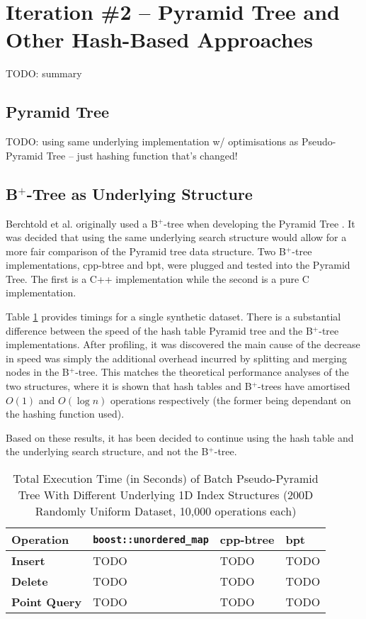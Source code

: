 \section{Iteration \#2 -- Pyramid Tree and Other Hash-Based Approaches}

TODO: summary

\subsection{Pyramid Tree}

TODO: using same underlying implementation w/ optimisations as Pseudo-Pyramid Tree -- just hashing function that's changed!

\subsection{B${}^+$-Tree as Underlying Structure}

Berchtold et al. originally used a B${}^{+}$-tree when developing the Pyramid Tree \cite{pyramid-tree}. It was decided that using the same underlying search structure would allow for a more fair comparison of the Pyramid tree data structure. Two B${}^{+}$-tree implementations, cpp-btree\cite{cpp-btree} and bpt\cite{bpt}, were plugged and tested into the Pyramid Tree. The first is a C++ implementation while the second is a pure C implementation.

Table \ref{tab:hashtable-bplus-time-comparison} provides timings for a single synthetic dataset. There is a substantial difference between the speed of the hash table Pyramid tree and the B${}^{+}$-tree implementations. After profiling, it was discovered the main cause of the decrease in speed was simply the additional overhead incurred by splitting and merging nodes in the B${}^{+}$-tree. This matches the theoretical performance analyses of the two structures, where it is shown that hash tables and B${}^{+}$-trees have amortised $O(1)$ and $O(\log n)$ operations respectively (the former being dependant on the hashing function used).

Based on these results, it has been decided to continue using the hash table and the underlying search structure, and not the B${}^{+}$-tree.

\begin{table}
	\centering
	\begin{tabular}{|l|l|l|l|}
		\hline
		\textbf{Operation} & \texttt{boost::unordered\_map} & cpp-btree & bpt \\
		\hline
		\textbf{Insert} & TODO & TODO & TODO \\
		\textbf{Delete} & TODO & TODO & TODO \\
		\textbf{Point Query} & TODO & TODO & TODO \\
		\hline
	\end{tabular}
	\caption{Total Execution Time (in Seconds) of Batch Pseudo-Pyramid Tree With Different Underlying 1D Index Structures (200D Randomly Uniform Dataset, 10,000 operations each)}
	\label{tab:hashtable-bplus-time-comparison}
\end{table}

